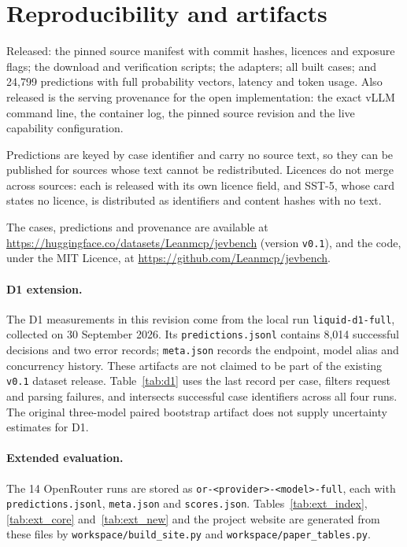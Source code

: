 \section{Reproducibility and artifacts}

Released: the pinned source manifest with commit hashes, licences and exposure flags; the download and verification scripts; the adapters; all built cases; and 24{,}799 predictions with full probability vectors, latency and token usage. Also released is the serving provenance for the open implementation: the exact vLLM command line, the container log, the pinned source revision and the live capability configuration.

Predictions are keyed by case identifier and carry no source text, so they can be published for sources whose text cannot be redistributed. Licences do not merge across sources: each is released with its own licence field, and SST-5, whose card states no licence, is distributed as identifiers and content hashes with no text.

The cases, predictions and provenance are available at \url{https://huggingface.co/datasets/Leanmcp/jevbench} (version \texttt{v0.1}), and the code, under the MIT Licence, at \url{https://github.com/Leanmcp/jevbench}.

\paragraph{D1 extension.} The D1 measurements in this revision come from the
local run \texttt{liquid-d1-full}, collected on 30 September 2026. Its
\texttt{predictions.jsonl} contains 8{,}014 successful decisions and two error
records; \texttt{meta.json} records the endpoint, model alias and concurrency
history. These artifacts are not claimed to be part of the existing
\texttt{v0.1} dataset release. Table~\ref{tab:d1} uses the last record per case,
filters request and parsing failures, and intersects successful case identifiers
across all four runs. The original three-model paired bootstrap artifact does
not supply uncertainty estimates for D1.

\paragraph{Extended evaluation.} The 14 OpenRouter runs are stored as
\texttt{or-<provider>-<model>-full}, each with \texttt{predictions.jsonl},
\texttt{meta.json} and \texttt{scores.json}. Tables~\ref{tab:ext_index},
\ref{tab:ext_core} and~\ref{tab:ext_new} and the project website are generated
from these files by \texttt{workspace/build\_site.py} and
\texttt{workspace/paper\_tables.py}.
